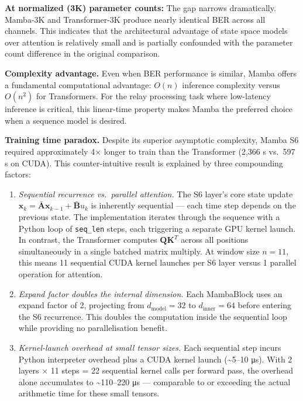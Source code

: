 \documentclass[
  english,
  12pt,
  12pt,
  a4paper,
  oneside]{report}
\begin{document}
\textbf{At normalized (3K) parameter counts:} The gap narrows dramatically. Mamba-3K and Transformer-3K produce nearly identical BER across all channels. This indicates that the architectural advantage of state space models over attention is relatively small and is partially confounded with the parameter count difference in the original comparison.

\textbf{Complexity advantage.} Even when BER performance is similar, Mamba offers a fundamental computational advantage: \(O(n)\) inference complexity versus \(O(n^2)\) for Transformers. For the relay processing task where low-latency inference is critical, this linear-time property makes Mamba the preferred choice when a sequence model is desired.

\textbf{Training time paradox.} Despite its superior asymptotic complexity, Mamba S6 required approximately 4× longer to train than the Transformer (2,366 s vs.~597 s on CUDA). This counter-intuitive result is explained by three compounding factors:

\begin{enumerate}
\def\labelenumi{\arabic{enumi}.}
\item
  \emph{Sequential recurrence vs.~parallel attention.} The S6 layer's core state update \(\mathbf{x}_k = \bar{\mathbf{A}} \mathbf{x}_{k-1} + \bar{\mathbf{B}} u_k\) is inherently sequential --- each time step depends on the previous state. The implementation iterates through the sequence with a Python loop of \texttt{seq\_len} steps, each triggering a separate GPU kernel launch. In contrast, the Transformer computes \(\mathbf{Q}\mathbf{K}^T\) across all positions simultaneously in a single batched matrix multiply. At window size \(n = 11\), this means 11 sequential CUDA kernel launches per S6 layer versus 1 parallel operation for attention.
\item
  \emph{Expand factor doubles the internal dimension.} Each MambaBlock uses an expand factor of 2, projecting from \(d_\text{model} = 32\) to \(d_\text{inner} = 64\) before entering the S6 recurrence. This doubles the computation inside the sequential loop while providing no parallelisation benefit.
\item
  \emph{Kernel-launch overhead at small tensor sizes.} Each sequential step incurs Python interpreter overhead plus a CUDA kernel launch (\textasciitilde5--10 μs). With 2 layers × 11 steps = 22 sequential kernel calls per forward pass, the overhead alone accumulates to \textasciitilde110--220 μs --- comparable to or exceeding the actual arithmetic time for these small tensors.
\end{enumerate}
\end{document}
